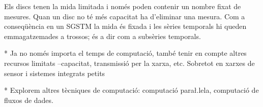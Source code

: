 Els discs tenen la mida limitada i només poden contenir un nombre
fixat de mesures. Quan un disc no té més capacitat ha d'eliminar una
mesura. Com a conseqüència en un SGSTM la mida és fixada i les sèries
temporals hi queden emmagatzemades a trossos; és a dir com a subsèries
temporals.





* Ja no només importa el temps de computació, també tenir en compte altres recursos limitats --capacitat, transmissió per la xarxa, etc. Sobretot en xarxes de sensor i sistemes integrats petits

* Explorem altres tècniques de computació: computació para\l.lela, computació de fluxos de dades.